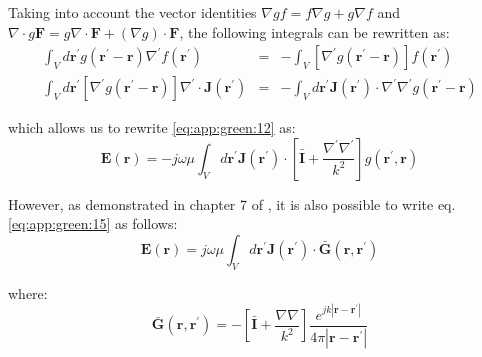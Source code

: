 			Taking into account the vector identities $\nabla gf = f\nabla g + g\nabla f$ and $\nabla\cdot g\mathbf{F} = g\nabla\cdot\mathbf{F} + (\nabla g)\cdot\mathbf{F}$, the following integrals can be rewritten as:
			\begin{eqnarray}
				\int_V d\mathbf{r^\prime} g(\mathbf{r^\prime}-\mathbf{r})\nabla^\prime f(\mathbf{r^\prime}) &=& - \int_V \left[\nabla^\prime g(\mathbf{r^\prime}-\mathbf{r})\right]f(\mathbf{r^\prime}) \label{eq:app:green:13} \\
				 \int_V d\mathbf{r^\prime} \left[\nabla^\prime g(\mathbf{r^\prime}-\mathbf{r})\right]\nabla^\prime\cdot\mathbf{J}(\mathbf{r^\prime}) &=& -\int_V d\mathbf{r}^\prime\mathbf{J}(\mathbf{r^\prime})\cdot\nabla^\prime\nabla^\prime g(\mathbf{r^\prime}-\mathbf{r}) \label{eq:app:green:14}
			\end{eqnarray}
	
			\noindent which allows us to rewrite \eqref{eq:app:green:12} as:
			\begin{equation}
				\mathbf{E}(\mathbf{r}) = -j\omega\mu\int_V d\mathbf{r^\prime} \mathbf{J}(\mathbf{r^\prime})\cdot\left[\mathbf{\bar{I}}+\frac{\nabla^\prime\nabla^\prime}{k^2}\right]g(\mathbf{r^\prime},\mathbf{r}) \label{eq:app:green:15}
			\end{equation}
		
			However, as demonstrated in chapter 7 of \citep{chew1995}, it is also possible to write eq.\eqref{eq:app:green:15} as follows:
			\begin{equation}
				\mathbf{E}(\mathbf{r}) = j\omega\mu\int_V d\mathbf{r^\prime} \mathbf{J}(\mathbf{r^\prime})\cdot\mathbf{\bar{G}}(\mathbf{r},\mathbf{r^\prime}) \label{eq:app:green:16}
			\end{equation}
		
			\noindent where:
			\begin{equation}
				\mathbf{\bar{G}}(\mathbf{r},\mathbf{r^\prime}) = -\left[\mathbf{\bar{I}}+\frac{\nabla\nabla}{k^2}\right]\frac{e^{jk|\mathbf{\mathbf{r}-\mathbf{r^\prime}}|}}{4\pi|\mathbf{\mathbf{r}-\mathbf{r^\prime}}|} \label{eq:app:green:17}
			\end{equation}
		
